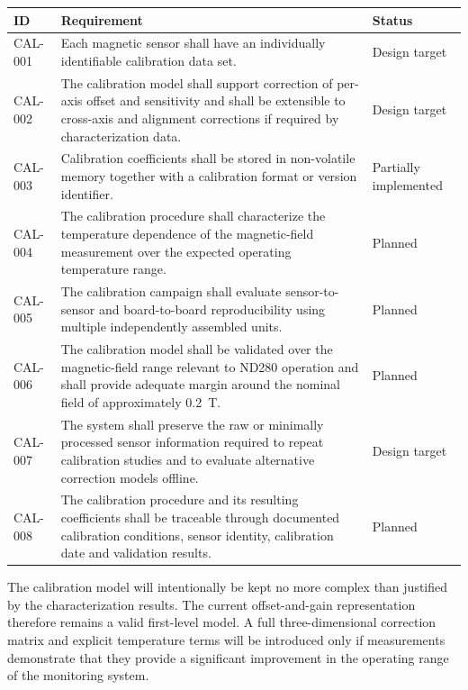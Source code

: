 \begin{longtable}{p{18mm}p{106mm}p{23mm}}
\toprule
ID & Requirement & Status \\
\midrule

CAL-001 &
Each magnetic sensor shall have an individually identifiable calibration data set. &
Design target \\

CAL-002 &
The calibration model shall support correction of per-axis offset and sensitivity and shall be extensible to cross-axis and alignment corrections if required by characterization data. &
Design target \\

CAL-003 &
Calibration coefficients shall be stored in non-volatile memory together with a calibration format or version identifier. &
Partially implemented \\

CAL-004 &
The calibration procedure shall characterize the temperature dependence of the magnetic-field measurement over the expected operating temperature range. &
Planned \\

CAL-005 &
The calibration campaign shall evaluate sensor-to-sensor and board-to-board reproducibility using multiple independently assembled units. &
Planned \\

CAL-006 &
The calibration model shall be validated over the magnetic-field range relevant to ND280 operation and shall provide adequate margin around the nominal field of approximately \SI{0.2}{T}. &
Planned \\

CAL-007 &
The system shall preserve the raw or minimally processed sensor information required to repeat calibration studies and to evaluate alternative correction models offline. &
Design target \\

CAL-008 &
The calibration procedure and its resulting coefficients shall be traceable through documented calibration conditions, sensor identity, calibration date and validation results. &
Planned \\

\bottomrule
\end{longtable}

The calibration model will intentionally be kept no more complex than justified by the characterization results. The current offset-and-gain representation therefore remains a valid first-level model. A full three-dimensional correction matrix and explicit temperature terms will be introduced only if measurements demonstrate that they provide a significant improvement in the operating range of the monitoring system.

